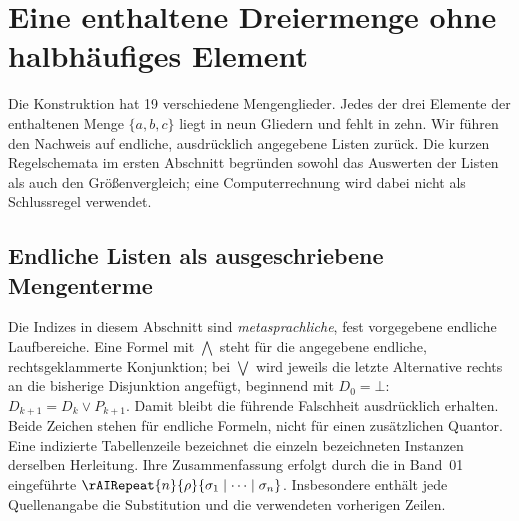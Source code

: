 
\chapter{Eine enthaltene Dreiermenge ohne halbhäufiges Element}
\hypertarget{frankl.triple.construction}{}

Die Konstruktion hat 19 verschiedene Mengenglieder. Jedes der drei
Elemente der enthaltenen Menge \(\{a,b,c\}\) liegt in neun Gliedern und
fehlt in zehn. Wir führen den Nachweis auf endliche, ausdrücklich
angegebene Listen zurück. Die kurzen Regelschemata im ersten Abschnitt
begründen sowohl das Auswerten der Listen als auch den Größenvergleich;
eine Computerrechnung wird dabei nicht als Schlussregel verwendet.

\section{Endliche Listen als ausgeschriebene Mengenterme}

Die Indizes in diesem Abschnitt sind \emph{metasprachliche}, fest
vorgegebene endliche Laufbereiche. Eine Formel mit \(\bigwedge\) steht
für die angegebene endliche, rechtsgeklammerte Konjunktion; bei
\(\bigvee\) wird jeweils die letzte Alternative rechts an die bisherige
Disjunktion angefügt, beginnend mit \(D_0=\bot\):
\(D_{k+1}=D_k\lor P_{k+1}\). Damit bleibt die führende Falschheit
ausdrücklich erhalten. Beide Zeichen stehen für endliche Formeln,
nicht für einen zusätzlichen Quantor. Eine indizierte Tabellenzeile
bezeichnet die einzeln bezeichneten Instanzen derselben Herleitung.
Ihre Zusammenfassung erfolgt durch die in Band~01 eingeführte
\(\rAIRepeat{n}{\rho}{\sigma_1\mid\cdots\mid\sigma_n}\).
Insbesondere enthält jede Quellenangabe die Substitution und die
verwendeten vorherigen Zeilen.

